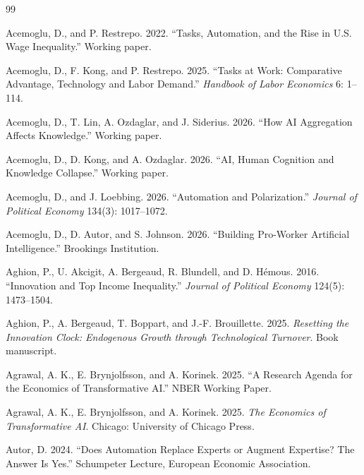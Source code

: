 \documentclass[11pt]{article}
\begin{document}
\begin{thebibliography}{99}

Acemoglu, D., and P. Restrepo. 2022.
\newblock ``Tasks, Automation, and the Rise in U.S. Wage Inequality.''
\newblock Working paper.

Acemoglu, D., F. Kong, and P. Restrepo. 2025.
\newblock ``Tasks at Work: Comparative Advantage, Technology and Labor Demand.''
\newblock \emph{Handbook of Labor Economics} 6: 1--114.

Acemoglu, D., T. Lin, A. Ozdaglar, and J. Siderius. 2026.
\newblock ``How AI Aggregation Affects Knowledge.''
\newblock Working paper.

Acemoglu, D., D. Kong, and A. Ozdaglar. 2026.
\newblock ``AI, Human Cognition and Knowledge Collapse.''
\newblock Working paper.

Acemoglu, D., and J. Loebbing. 2026.
\newblock ``Automation and Polarization.''
\newblock \emph{Journal of Political Economy} 134(3): 1017--1072.

Acemoglu, D., D. Autor, and S. Johnson. 2026.
\newblock ``Building Pro-Worker Artificial Intelligence.''
\newblock Brookings Institution.

Aghion, P., U. Akcigit, A. Bergeaud, R. Blundell, and D. H\'emous. 2016.
\newblock ``Innovation and Top Income Inequality.''
\newblock \emph{Journal of Political Economy} 124(5): 1473--1504.

Aghion, P., A. Bergeaud, T. Boppart, and J.-F. Brouillette. 2025.
\newblock \emph{Resetting the Innovation Clock: Endogenous Growth through Technological Turnover}.
\newblock Book manuscript.

Agrawal, A. K., E. Brynjolfsson, and A. Korinek. 2025.
\newblock ``A Research Agenda for the Economics of Transformative AI.''
\newblock NBER Working Paper.

Agrawal, A. K., E. Brynjolfsson, and A. Korinek. 2025.
\newblock \emph{The Economics of Transformative AI}.
\newblock Chicago: University of Chicago Press.

Autor, D. 2024.
\newblock ``Does Automation Replace Experts or Augment Expertise? The Answer Is Yes.''
\newblock Schumpeter Lecture, European Economic Association.


\end{thebibliography}
\end{document}
